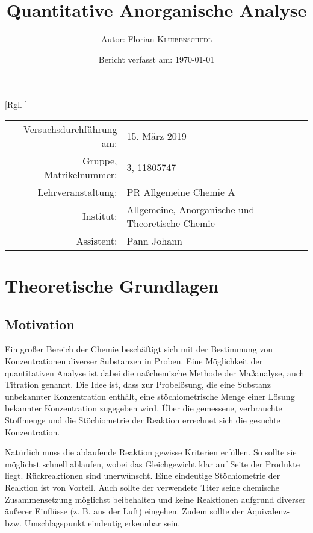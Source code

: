 \documentclass{article}
\title{Quantitative Anorganische Analyse \cite{Versuchsvorschrift}} %
\author{Autor: Florian \textsc{Kluibenschedl}} %
\date{Bericht verfasst am: \today} %
\begin{document}
  [Rgl. ]{}{}
  
  \maketitle %
  
  \begin{center}
    \begin{tabular}{r p{4cm}}
      Versuchsdurchführung am: & 15. März 2019\\ %
      Gruppe, Matrikelnummer: & 3, 11805747 \\
      Lehrveranstaltung: & PR Allgemeine Chemie A \\
      Institut: & Allgemeine, Anorganische und Theoretische Chemie \\
      Assistent: & Pann Johann %
    \end{tabular}
  \end{center}


  \begin{abstract}
    
  \end{abstract}
  
  \pagebreak 
  
  \section{Theoretische Grundlagen}
  
    \subsection{Motivation} \label{sec:Motivation}
      
      Ein großer Bereich der Chemie beschäftigt sich mit der Bestimmung von Konzentrationen diverser Substanzen in Proben. Eine Möglichkeit der quantitativen Analyse ist dabei die naßchemische Methode der Maßanalyse, auch Titration genannt. Die Idee ist, dass zur Probelösung, die eine Substanz unbekannter Konzentration enthält, eine stöchiometrische Menge einer Lösung bekannter Konzentration zugegeben wird. Über die gemessene, verbrauchte Stoffmenge und die Stöchiometrie der Reaktion errechnet sich die gesuchte Konzentration.
      
      Natürlich muss die ablaufende Reaktion gewisse Kriterien erfüllen. So sollte sie möglichst schnell ablaufen, wobei das Gleichgewicht klar auf Seite der Produkte liegt. Rückreaktionen sind unerwünscht. Eine eindeutige Stöchiometrie der Reaktion ist von Vorteil. Auch sollte der verwendete Titer  seine chemische Zusammensetzung möglichst beibehalten und keine Reaktionen aufgrund diverser äußerer Einflüsse (z. B.  aus der Luft) eingehen. Zudem sollte der Äquivalenz- bzw. Umschlagspunkt eindeutig erkennbar sein. 
      
\end{document}
